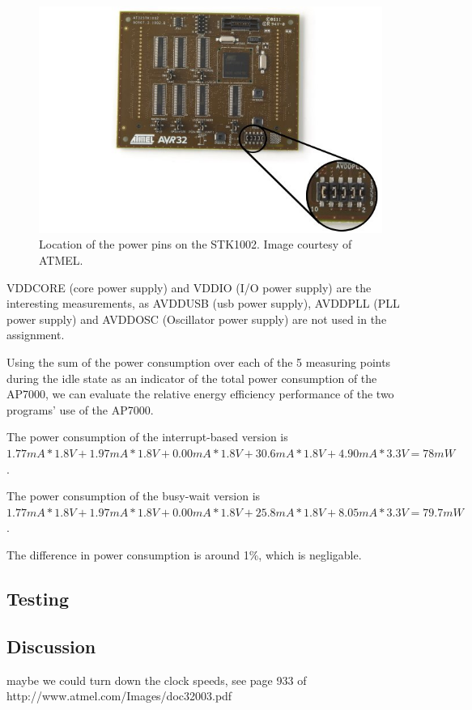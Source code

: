 \begin{figure}
\includegraphics[width = \textwidth]{results-and-tests/power-pins-location.jpg}
\caption{Location of the power pins on the STK1002. Image courtesy of ATMEL.}
\label{power-pins-location}
\end{figure}

VDDCORE (core power supply) and VDDIO (I/O power supply) are the interesting measurements, as AVDDUSB (usb power supply), AVDDPLL (PLL power supply) and AVDDOSC (Oscillator power supply) are not used in the assignment.

Using the sum of the power consumption over each of the 5 measuring points during the idle state as an indicator of the total power consumption of the AP7000, we can evaluate the relative energy efficiency performance of the two programs' use of the AP7000.

The power consumption of the interrupt-based version is 
$
1.77mA * 1.8V +
1.97mA * 1.8V +
0.00mA * 1.8V +
30.6mA * 1.8V +
4.90mA * 3.3V
=
78mW
$
.

The power consumption of the busy-wait version is 
$
1.77mA * 1.8V +
1.97mA * 1.8V +
0.00mA * 1.8V +
25.8mA * 1.8V +
8.05mA * 3.3V
=
79.7mW
$
.

The difference in power consumption is around 1\%, which is negligable.


\subsection{Testing}

	

\subsection{Discussion}

maybe we could turn down the clock speeds, see page 933 of http://www.atmel.com/Images/doc32003.pdf
